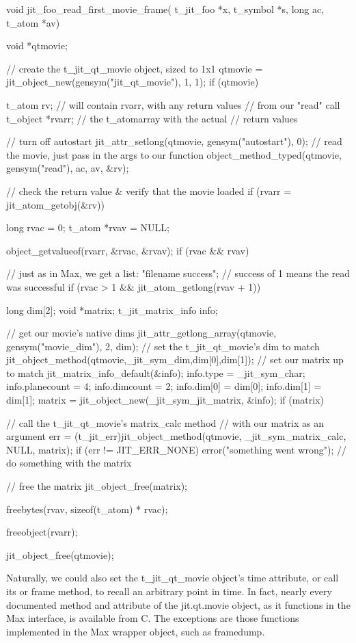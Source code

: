 \begin{DoxyCode}
void jit_foo_read_first_movie_frame(
   t_jit_foo *x, t_symbol *s, long ac, t_atom *av)
{
   void *qtmovie;
   
   // create the t_jit_qt_movie object, sized to 1x1
   qtmovie = jit_object_new(gensym("jit_qt_movie"), 1, 1);
   if (qtmovie) {
      t_atom rv; // will contain rvarr, with any return values 
                 // from our "read" call
      t_object *rvarr; // the t_atomarray with the actual 
                       // return values

      // turn off autostart
      jit_attr_setlong(qtmovie, gensym("autostart"), 0); 
      // read the movie, just pass in the args to our function
      object_method_typed(qtmovie, gensym("read"), ac, av, &rv);
      
      // check the return value & verify that the movie loaded
      if (rvarr = jit_atom_getobj(&rv)) {
         long rvac = 0;
         t_atom *rvav = NULL;
         
         object_getvalueof(rvarr, &rvac, &rvav);
         if (rvac && rvav) {
            // just as in Max, we get a list: "filename success";
            // success of 1 means the read was successful
            if (rvac > 1 && jit_atom_getlong(rvav + 1)) {               
               long dim[2];
               void *matrix;
               t_jit_matrix_info info;

               // get our movie's native dims
               jit_attr_getlong_array(qtmovie, gensym("movie_dim"),
                  2, dim);
               // set the t_jit_qt_movie's dim to match
               jit_object_method(qtmovie,_jit_sym_dim,dim[0],dim[1]);
               // set our matrix up to match
               jit_matrix_info_default(&info);
               info.type = _jit_sym_char;
               info.planecount = 4;
               info.dimcount = 2;
               info.dim[0] = dim[0];
               info.dim[1] = dim[1];
               matrix = jit_object_new(_jit_sym_jit_matrix, &info);
               if (matrix) {
                  // call the t_jit_qt_movie's matrix_calc method 
                  // with our matrix as an argument
                  err = (t_jit_err)jit_object_method(qtmovie,
                     _jit_sym_matrix_calc, NULL, matrix);
                  if (err != JIT_ERR_NONE) {
                     error("something went wrong");
                  }
                  // do something with the matrix
                  
                  // free the matrix
                  jit_object_free(matrix);
               }
            }
            freebytes(rvav, sizeof(t_atom) * rvac);
         }
         freeobject(rvarr);
      }
      jit_object_free(qtmovie);
   }
}
\end{DoxyCode}


Naturally, we could also set the t\_\-jit\_\-qt\_\-movie object's time attribute, or call its or frame method, to recall an arbitrary point in time. In fact, nearly every documented method and attribute of the jit.qt.movie object, as it functions in the Max interface, is available from C. The exceptions are those functions implemented in the Max wrapper object, such as framedump. 